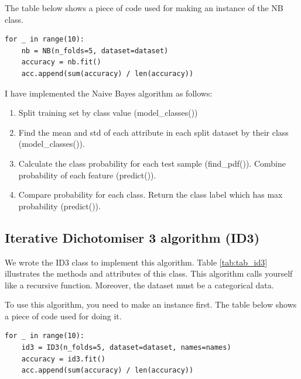 The table below shows a piece of code used for making an instance of the NB class.

\begin{table}[H]
\centering
\caption{Making an instance of NB class.}
\begin{lstlisting}
for _ in range(10):
    nb = NB(n_folds=5, dataset=dataset)
    accuracy = nb.fit()
    acc.append(sum(accuracy) / len(accuracy))
\end{lstlisting}
\end{table}


I have implemented the Naive Bayes algorithm as follows:
\begin{enumerate}
    \item Split training set by class value (model\_classes())
    \item Find the mean and std of each attribute in each split dataset by their class (model\_classes()).
    \item Calculate the class probability for each test sample (find\_pdf()). Combine probability of each feature (predict()).
    \item Compare probability for each class. Return the class label which has max probability (predict()).
    
\end{enumerate}















\subsection{Iterative Dichotomiser 3 algorithm (ID3)}
We wrote the ID3 class to implement this algorithm.  Table \ref{tab:tab_id3} illustrates the methods and attributes of this class. This algorithm calls yourself like a recursive function. Moreover, the dataset must be a categorical data.

\begin{table}[H]
\centering
\caption{The methods and attributes of ID3 class.}
\label{tab:tab_id3}

\end{table}
To use this algorithm, you need to make an instance first. The table below shows a piece of code used for doing it.

\begin{table}[H]
\centering
\caption{Making an instance of ID3 class.}
\begin{lstlisting}
for _ in range(10):
    id3 = ID3(n_folds=5, dataset=dataset, names=names)
    accuracy = id3.fit()
    acc.append(sum(accuracy) / len(accuracy))
\end{lstlisting}
\end{table}


